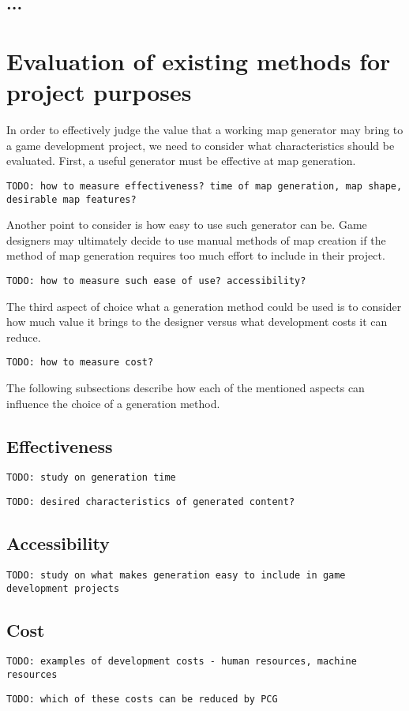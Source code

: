 \documentclass[12pt]{report}
\newcommand{\todo}[1]{}
\renewcommand{\todo}[1]{{\color{red} \par \noindent \footnotesize \texttt{TODO: {#1} }}}
\begin{document}
\subsection{...}
\section{Evaluation of existing methods for project purposes}

In order to effectively judge the value that a working map generator may bring to a game development project, we need to consider what characteristics should be evaluated. First, a useful generator must be effective at map generation.

\todo{how to measure effectiveness? time of map generation, map shape, desirable map features?}

Another point to consider is how easy to use such generator can be. Game designers may ultimately decide to use manual methods of map creation if the method of map generation requires too much effort to include in their project.

\todo{how to measure such ease of use? accessibility? }

The third aspect of choice what a generation method could be used is to consider how much value it brings to the designer versus what development costs it can reduce.

\todo{how to measure cost?}

The following subsections describe how each of the mentioned aspects can influence the choice of a generation method.

\subsection{Effectiveness} 
\todo{study on generation time}
\todo{desired characteristics of generated content?}

\subsection{Accessibility} 

\todo{study on what makes generation easy to include in game development projects}

\subsection{Cost} 
\todo{examples of development costs - human resources, machine resources}
\todo{which of these costs can be reduced by PCG}
\end{document}
